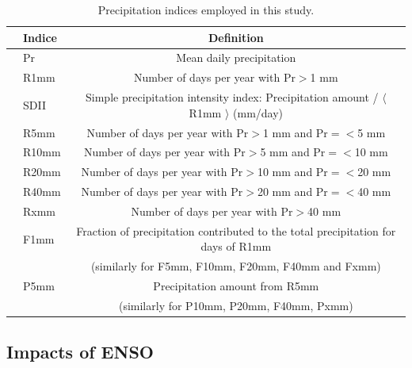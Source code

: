 \begin{table}
\begin{center}
\caption{Precipitation indices employed in this study.} \label{tab:table1}
\begin{tabular*}{5.0in}{l @{\extracolsep{\fill}}lc}
\hline \textbf{} & \textbf{Indice} & \textbf{Definition} \\
\hline & Pr & Mean daily precipitation \\
\hline & R1mm & Number of days per year with Pr$>$1 mm\\
\hline & SDII & Simple precipitation intensity index: Precipitation amount / $\langle$ R1mm $\rangle$ (mm/day) \\
\hline & R5mm & Number of days per year with Pr$>$1 mm and Pr$=<$5 mm\\
\hline & R10mm & Number of days per year with Pr$>$5 mm and Pr$=<$10 mm\\
\hline & R20mm & Number of days per year with Pr$>$10 mm and Pr$=<$20 mm\\
\hline & R40mm & Number of days per year with Pr$>$20 mm and Pr$=<$40 mm\\
\hline & Rxmm & Number of days per year with Pr$>$40 mm\\
\hline & F1mm & Fraction of precipitation contributed to the total precipitation for days of R1mm\\ 
 & & (similarly for F5mm, F10mm, F20mm,  F40mm and Fxmm) \\
\hline & P5mm & Precipitation amount from R5mm \\
 & & (similarly for P10mm, P20mm, F40mm,  Pxmm) \\
\hline 
\end{tabular*}
\end{center}
\end{table}

\subsection{Impacts of ENSO}


